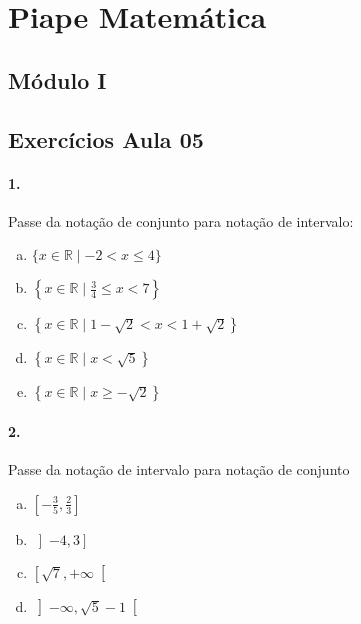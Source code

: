 \documentclass[a4paper,twocolumn,12pt]{article}
\begin{document}
 
\section*{Piape Matemática} 
 
\subsection*{Módulo I}
\subsection*{Exercícios Aula 05}

\paragraph{1.} Passe da notação de conjunto para notação de intervalo:
\begin{enumerate}[a)]
\item $\{x \in \mathbb{R} \mid -2 < x \leq 4\}$
\item $\left\{x \in \mathbb{R} \mid \frac{3}{4} \leq x < 7\right\}$
\item $\left\{x \in \mathbb{R} \mid 1-\sqrt{2} < x < 1+\sqrt{2}\right\}$
\item $\left\{x \in \mathbb{R} \mid x < \sqrt{5}\right\}$
\item $\left\{x \in \mathbb{R} \mid x \geq -\sqrt{2}\right\}$
\end{enumerate}

\paragraph*{2. } Passe da notação de intervalo para notação de conjunto 
\begin{enumerate}[a)]
  \item $\left[-\frac{3}{5},\frac{2}{3}\right]$
  \item $\left]-4,3\right]$
  \item $\left[\sqrt{7},+\infty\right[$
  \item $\left]-\infty, \sqrt{5}-1\right[$
\end{enumerate} 
\end{document}
